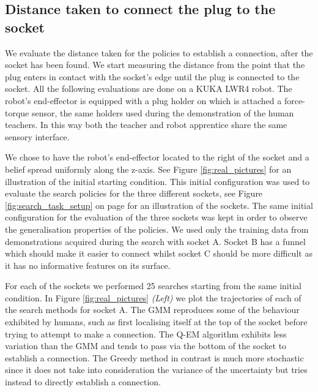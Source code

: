\documentclass[final,3p,times,twocolumn]{elsarticle}
\begin{document}

\subsection{Distance taken to connect the plug to the socket}

We evaluate the distance taken for the policies to establish a connection, after the socket has been found. We start measuring the distance 
from the point that the plug enters in contact with the socket's edge until the plug is connected to the socket. All the following evaluations are done 
on a KUKA LWR4 robot. The robot's end-effector is equipped with a plug holder on which is attached a force-torque sensor, 
the same holders used during the demonstration of the human teachers. In this way both the teacher and robot apprentice share 
the same sensory interface.

We chose to have the robot's end-effector located to the right of the socket and a belief spread uniformly 
along the z-axis. See Figure \ref{fig:real_pictures} for an illustration of the initial starting condition.
This initial configuration was used to evaluate the search policies for the three different sockets, see Figure \ref{fig:search_task_setup} 
on page \pageref{fig:search_task_setup} for an illustration of the sockets. The same initial configuration for 
the evaluation of the three sockets was kept in order to observe the generalisation properties of the policies. 
We used only the training data from demonstrations acquired during the search with socket A. Socket B has a funnel which should make it 
easier to connect whilst socket C should be more difficult as it has no informative features on its surface. 

For each of the sockets we performed 25 searches starting from the same initial condition. In Figure \ref{fig:real_pictures} \textit{(Left)} we plot
the trajectories of each of the search methods for socket A. The GMM reproduces some of the behaviour exhibited by humans, such as 
first localising itself at the top of the socket before trying to attempt to make a connection. The Q-EM algorithm exhibits less variation
than the GMM and tends to pass via the bottom of the socket to establish a connection. The Greedy method in contrast is much more  
stochastic since it does not take into consideration the variance of the uncertainty but tries instead to directly establish a connection.
\end{document}
